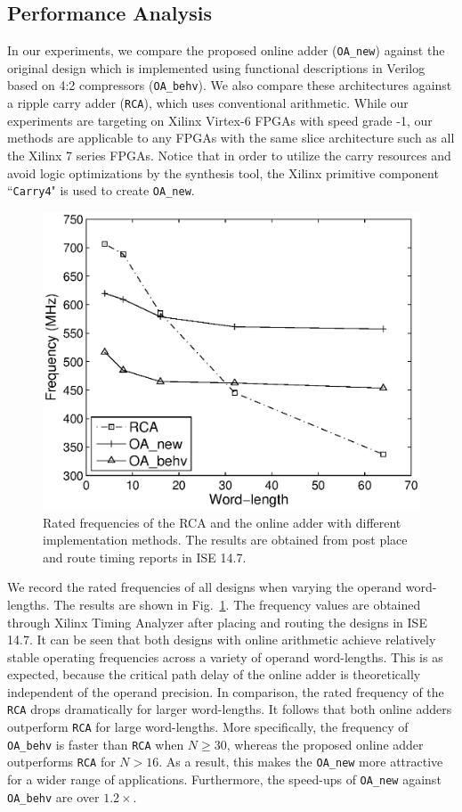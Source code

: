 \documentclass[conference]{IEEEtran}
\begin{document}
\subsection{Performance Analysis}\label{subsec:OA_Performance}
In our experiments, we compare the proposed online adder (\texttt{OA\_new}) against the original design which is implemented using functional descriptions in Verilog based on 4:2 compressors (\texttt{OA\_behv}).  We also compare these architectures against a ripple carry adder (\texttt{RCA}), which uses conventional arithmetic. While our experiments are targeting on Xilinx Virtex-6 FPGAs with speed grade -1, our methods are applicable to any FPGAs with the same slice architecture such as all the Xilinx 7 series FPGAs. Notice that in order to utilize the carry resources and avoid logic optimizations by the synthesis tool, the Xilinx primitive component ``\texttt{Carry4}" is used to create \texttt{OA\_new}.

\begin{figure}[tbp]
	\centering
	\includegraphics[width=.45\textwidth]{./Figures/Exp/Adder_Freq.eps}
	\caption{Rated frequencies of the RCA and the online adder with different implementation methods. The results are obtained from post place and route timing reports in ISE 14.7.}
	\label{Fig:AdderFreq}
	\vspace{-1ex}
\end{figure}


We record the rated frequencies of all designs when varying the operand word-lengths. The results are shown in Fig.~\ref{Fig:AdderFreq}. The frequency values are obtained through Xilinx Timing Analyzer after placing and routing the designs in ISE 14.7. It can be seen that both designs with online arithmetic achieve relatively stable operating frequencies across a variety of operand word-lengths. This is as expected, because the critical path delay of the online adder is theoretically independent of the operand precision. In comparison, the rated frequency of the \texttt{RCA} drops dramatically for larger word-lengths. It follows that both online adders outperform \texttt{RCA} for large word-lengths. More specifically, the frequency of \texttt{OA\_behv} is faster than \texttt{RCA} when $N\geqslant30$, whereas the proposed online adder outperforms \texttt{RCA} for $N>16$. As a result, this makes the \texttt{OA\_new} more attractive for a wider range of applications. Furthermore, the speed-ups of \texttt{OA\_new} against \texttt{OA\_behv} are over $1.2\times$.
\end{document}
